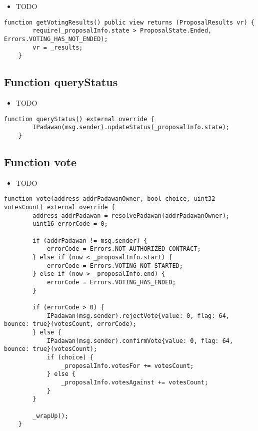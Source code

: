 \begin{itemize}
\item TODO
\end{itemize}

\begin{lstlisting}[firstnumber=172]
    function getVotingResults() public view returns (ProposalResults vr) {
        require(_proposalInfo.state > ProposalState.Ended, Errors.VOTING_HAS_NOT_ENDED);
        vr = _results;
    }
\end{lstlisting}

\subsection{Function queryStatus}

\begin{itemize}
\item TODO
\end{itemize}

\begin{lstlisting}[firstnumber=162]
    function queryStatus() external override {
        IPadawan(msg.sender).updateStatus(_proposalInfo.state);
    }
\end{lstlisting}

\subsection{Function vote}

\begin{itemize}
\item TODO
\end{itemize}

\begin{lstlisting}[firstnumber=55]
    function vote(address addrPadawanOwner, bool choice, uint32 votesCount) external override {
        address addrPadawan = resolvePadawan(addrPadawanOwner);
        uint16 errorCode = 0;

        if (addrPadawan != msg.sender) {
            errorCode = Errors.NOT_AUTHORIZED_CONTRACT;
        } else if (now < _proposalInfo.start) {
            errorCode = Errors.VOTING_NOT_STARTED;
        } else if (now > _proposalInfo.end) {
            errorCode = Errors.VOTING_HAS_ENDED;
        }

        if (errorCode > 0) {
            IPadawan(msg.sender).rejectVote{value: 0, flag: 64, bounce: true}(votesCount, errorCode);
        } else {
            IPadawan(msg.sender).confirmVote{value: 0, flag: 64, bounce: true}(votesCount);
            if (choice) {
                _proposalInfo.votesFor += votesCount;
            } else {
                _proposalInfo.votesAgainst += votesCount;
            }
        }

        _wrapUp();
    }
\end{lstlisting}

